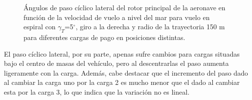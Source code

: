 \begin{figure}
	\centering
	\caption{Ángulos de paso cíclico lateral del rotor principal de la aeronave en función de la velocidad de vuelo a nivel del mar para vuelo en espiral con $\gamma_T$=5$^\circ$, giro a la derecha y radio de la trayectoria 150 m para diferentes cargas de pago en posiciones distintas.}
	\label{Theta1SVEMPL}
\end{figure}

El paso cíclico lateral, por su parte, apenas sufre cambios para cargas situadas bajo el centro de masas del vehículo, pero al descentrarlas el paso aumenta ligeramente con la carga. Además, cabe destacar que el incremento del paso dado al cambiar la carga uno por la carga 2 es mucho menor que el dado al cambiar esta por la carga 3, lo que indica que la variación no es lineal.

